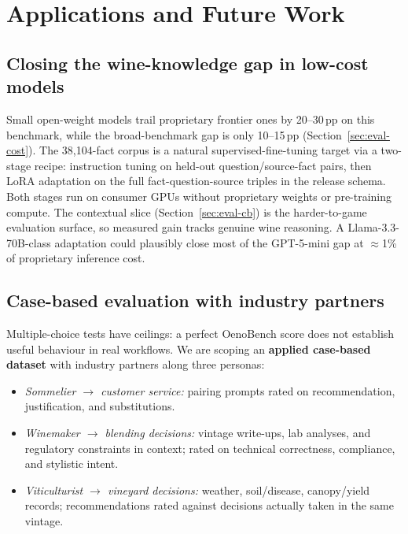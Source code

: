 \section{Applications and Future Work}
\label{sec:future}

\subsection{Closing the wine-knowledge gap in low-cost models}
Small open-weight models trail proprietary frontier ones by 20--30\,pp
on this benchmark, while the broad-benchmark gap is only 10--15\,pp
(Section~\ref{sec:eval-cost}). The 38{,}104-fact corpus is a natural
supervised-fine-tuning target via a two-stage recipe: instruction
tuning on held-out question/source-fact pairs, then LoRA adaptation
on the full fact-question-source triples in the release schema. Both
stages run on consumer GPUs without proprietary weights or
pre-training compute. The contextual slice
(Section~\ref{sec:eval-cb}) is the harder-to-game evaluation surface,
so measured gain tracks genuine wine reasoning. A
Llama-3.3-70B-class adaptation could plausibly close most of the
GPT-5-mini gap at $\approx$1\% of proprietary inference cost.

\subsection{Case-based evaluation with industry partners}
Multiple-choice tests have ceilings: a perfect OenoBench score does
not establish useful behaviour in real workflows. We are scoping an
\textbf{applied case-based dataset} with industry partners along three
personas:
\begin{itemize}\itemsep -1pt
  \item \emph{Sommelier $\rightarrow$ customer service:} pairing
    prompts rated on recommendation, justification, and substitutions.
  \item \emph{Winemaker $\rightarrow$ blending decisions:} vintage
    write-ups, lab analyses, and regulatory constraints in context;
    rated on technical correctness, compliance, and stylistic intent.
  \item \emph{Viticulturist $\rightarrow$ vineyard decisions:}
    weather, soil/disease, canopy/yield records; recommendations
    rated against decisions actually taken in the same vintage.
\end{itemize}

